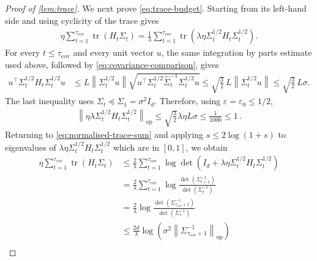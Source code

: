 \documentclass[11pt]{article}
\newcommand{\tr}{\operatorname{tr}}
\newcommand{\op}{\mathrm{op}}
\newcommand{\1}{\mathbf 1}
\newcommand{\eps}{\varepsilon}
\newcommand{\norm}[1]{\left\lVert #1\right\rVert}
\begin{document}
\begin{proof}[Proof of \cref{lem:trace}]
    We next prove \eqref{eq:trace-budget}.  Starting from its left-hand side
    and using cyclicity of the trace gives
    \begin{align}
        \eta\sum_{t=1}^{\tau_{\mathrm{cov}}}
        \tr(H_t\Sigma_t)
        =
        \frac1\lambda\sum_{t=1}^{\tau_{\mathrm{cov}}}
        \tr\left(
        \lambda\eta\Sigma_t^{1/2}H_t
        \Sigma_t^{1/2}
        \right).
        \label{eq:normalised-trace-sum}
    \end{align}
    For every $t\leq\tau_{\mathrm{cov}}$ and every unit vector $u$, the same integration by
    parts estimate used above, followed by
    \eqref{eq:covariance-comparison}, gives
    \begin{align}
        u^\top\Sigma_t^{1/2}H_t
        \Sigma_t^{1/2}u
         & \leq
        L\norm{\Sigma_t^{1/2}u}
        \sqrt{u^\top\Sigma_t^{1/2}
            \widehat\Sigma_t^{-1}\Sigma_t^{1/2}u}
        \leq
        \sqrt{\frac32}\,L
        \norm{\Sigma_t^{1/2}u}
        \leq
        \sqrt{\frac32}\,L\sigma.
        \label{eq:normalised-H}
    \end{align}
    The last inequality uses
    $\Sigma_t\preceq\Sigma_1=\sigma^2I_d$.
    Therefore, using $\eps=\eps_0\leq1/2$,
    \begin{align}
        \norm{\eta\lambda\Sigma_t^{1/2}H_t\Sigma_t^{1/2}}_{\op}
        \leq
        \sqrt{\frac32}\lambda\eta L\sigma
        \leq
        \frac1{1000}
        \leq
        1\,.
    \end{align}
    Returning to
    \eqref{eq:normalised-trace-sum} and applying
    $s\leq2\log(1+s)$ to eigenvalues of $\lambda\eta\Sigma_t^{1/2}H_t\Sigma_t^{1/2}$
    which are in $[0,1]$, we obtain
    \begin{align}
        \eta\sum_{t=1}^{\tau_{\mathrm{cov}}}
        \tr(H_t\Sigma_t)
         & \leq
        \frac2\lambda\sum_{t=1}^{\tau_{\mathrm{cov}}}
        \log\det\left(
        I_d+\lambda\eta\Sigma_t^{1/2}H_t
        \Sigma_t^{1/2}
        \right)               \\
         & =
        \frac2\lambda\sum_{t=1}^{\tau_{\mathrm{cov}}}
        \log\frac{\det(\Sigma_{t+1}^{-1})}
        {\det(\Sigma_t^{-1})} \\
         & =
        \frac2\lambda
        \log\frac{\det(\Sigma_{\tau_{\mathrm{cov}}+1}^{-1})}
        {\det(\Sigma_1^{-1})} \\
         & \leq
        \frac{2d}{\lambda}
        \log\left(
        \sigma^2
        \norm{\Sigma_{\tau_{\mathrm{cov}}+1}^{-1}}_{\op}
        \right)               \\

\end{align}
\end{proof}
\end{document}
